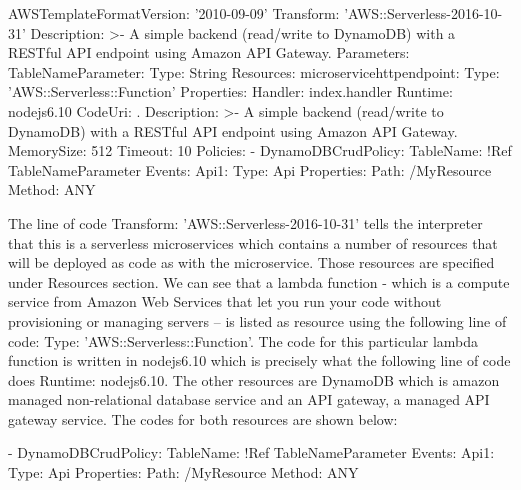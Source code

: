 \documentclass{article}
\begin{document}
AWSTemplateFormatVersion: '2010-09-09'
Transform: 'AWS::Serverless-2016-10-31'
Description: >-
  A simple backend (read/write to DynamoDB) with a RESTful API endpoint using Amazon API Gateway.
Parameters: 
  TableNameParameter: 
    Type: String
Resources:
  microservicehttpendpoint:
    Type: 'AWS::Serverless::Function'
    Properties:
      Handler: index.handler
      Runtime: nodejs6.10
      CodeUri: .
      Description: >-
        A simple backend (read/write to DynamoDB) with a RESTful API endpoint using Amazon API Gateway.
      MemorySize: 512
      Timeout: 10
      Policies:
        - DynamoDBCrudPolicy:
            TableName: !Ref TableNameParameter
      Events:
        Api1:
          Type: Api
          Properties:
            Path: /MyResource
            Method: ANY

The line of code Transform: 'AWS::Serverless-2016-10-31' tells the interpreter that this is a serverless microservices which contains a number of resources that will be deployed as code as with the microservice. Those resources are specified under Resources section. We can see that a lambda function - which is a compute service from Amazon Web Services that let you run your code without provisioning or managing servers – is listed as resource using the following line of code:  
Type: 'AWS::Serverless::Function'. The code for this particular lambda function is written in nodejs6.10 which is precisely what the following line of code does Runtime: nodejs6.10. The other resources are DynamoDB which is amazon managed non-relational database service and an API gateway, a managed API gateway service. The codes for both resources are shown below:

        - DynamoDBCrudPolicy:
            TableName: !Ref TableNameParameter
      Events:
        Api1:
          Type: Api
          Properties:
            Path: /MyResource
            Method: ANY
\end{document}
